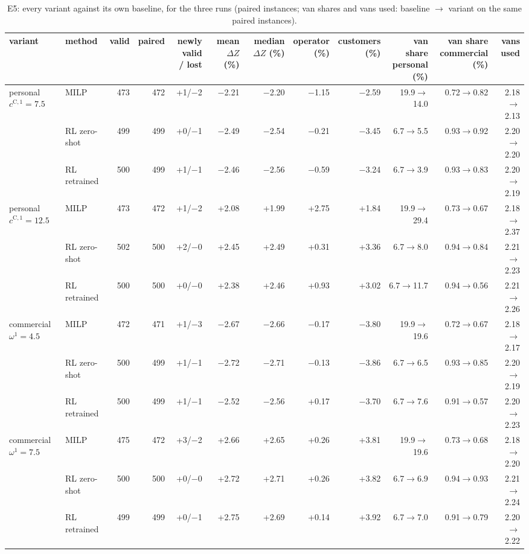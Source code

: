 \begin{table}[H]\centering
\scriptsize
\caption{E5: every variant against its own baseline, for the three runs (paired instances; van shares and vans used: baseline $\to$ variant on the same paired instances).}\label{tab:expE5}
\begin{adjustbox}{max width=\textwidth}\begin{tabular}{llrrrrrrrrrr}\toprule
variant & method & valid & paired & \shortstack{newly valid\\/ lost} & \shortstack{mean\\$\Delta Z$ (\%)} & \shortstack{median\\$\Delta Z$ (\%)} & \shortstack{operator\\(\%)} & \shortstack{customers\\(\%)} & \shortstack{van share\\personal (\%)} & \shortstack{van share\\commercial (\%)} & vans used \\ \midrule
personal $c^{\mathrm C,1}=7.5$ & MILP & 473 & 472 & +1/$-$2 & $-$2.21 & $-$2.20 & $-$1.15 & $-$2.59 & 19.9$\to$14.0 & 0.72$\to$0.82 & 2.18$\to$2.13 \\
 & RL zero-shot & 499 & 499 & +0/$-$1 & $-$2.49 & $-$2.54 & $-$0.21 & $-$3.45 & 6.7$\to$5.5 & 0.93$\to$0.92 & 2.20$\to$2.20 \\
 & RL retrained & 500 & 499 & +1/$-$1 & $-$2.46 & $-$2.56 & $-$0.59 & $-$3.24 & 6.7$\to$3.9 & 0.93$\to$0.83 & 2.20$\to$2.19 \\
personal $c^{\mathrm C,1}=12.5$ & MILP & 473 & 472 & +1/$-$2 & +2.08 & +1.99 & +2.75 & +1.84 & 19.9$\to$29.4 & 0.73$\to$0.67 & 2.18$\to$2.37 \\
 & RL zero-shot & 502 & 500 & +2/$-$0 & +2.45 & +2.49 & +0.31 & +3.36 & 6.7$\to$8.0 & 0.94$\to$0.84 & 2.21$\to$2.23 \\
 & RL retrained & 500 & 500 & +0/$-$0 & +2.38 & +2.46 & +0.93 & +3.02 & 6.7$\to$11.7 & 0.94$\to$0.56 & 2.21$\to$2.26 \\
commercial $\omega^{1}=4.5$ & MILP & 472 & 471 & +1/$-$3 & $-$2.67 & $-$2.66 & $-$0.17 & $-$3.80 & 19.9$\to$19.6 & 0.72$\to$0.67 & 2.18$\to$2.17 \\
 & RL zero-shot & 500 & 499 & +1/$-$1 & $-$2.72 & $-$2.71 & $-$0.13 & $-$3.86 & 6.7$\to$6.5 & 0.93$\to$0.85 & 2.20$\to$2.19 \\
 & RL retrained & 500 & 499 & +1/$-$1 & $-$2.52 & $-$2.56 & +0.17 & $-$3.70 & 6.7$\to$7.6 & 0.91$\to$0.57 & 2.20$\to$2.23 \\
commercial $\omega^{1}=7.5$ & MILP & 475 & 472 & +3/$-$2 & +2.66 & +2.65 & +0.26 & +3.81 & 19.9$\to$19.6 & 0.73$\to$0.68 & 2.18$\to$2.20 \\
 & RL zero-shot & 500 & 500 & +0/$-$0 & +2.72 & +2.71 & +0.26 & +3.82 & 6.7$\to$6.9 & 0.94$\to$0.93 & 2.21$\to$2.24 \\
 & RL retrained & 499 & 499 & +0/$-$1 & +2.75 & +2.69 & +0.14 & +3.92 & 6.7$\to$7.0 & 0.91$\to$0.79 & 2.20$\to$2.22 \\
\bottomrule\end{tabular}\end{adjustbox}\end{table}
